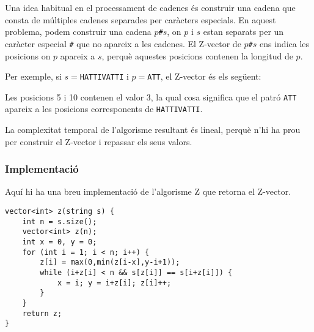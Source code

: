 Una idea habitual en el processament de cadenes és construir una
cadena que consta de múltiples cadenes separades per caràcters
especials. En aquest problema, podem construir una cadena
$p$\texttt{\#}$s$, on $p$ i $s$ estan separats per un caràcter
especial \texttt{\#} que no apareix a les cadenes. El Z-vector de
$p$\texttt{\#}$s$ ens indica les posicions on $p$ apareix a $s$,
perquè aquestes posicions contenen la longitud de $p$.

Per exemple, si $s=$\texttt{HATTIVATTI} i $p=$\texttt{ATT}, el
Z-vector és els següent:


\begin{center}
\end{center}


Les posicions 5 i 10 contenen el valor 3, la qual cosa significa que
el patró \texttt{ATT} apareix a les posicions corresponents de
\texttt{HATTIVATTI}.

La complexitat temporal de l'algorisme resultant és lineal, perquè
n'hi ha prou per construir el Z-vector i repassar els seus valors.

\subsubsection{Implementació}

Aquí hi ha una breu implementació de l'algorisme Z que retorna el Z-vector.


\begin{lstlisting}
vector<int> z(string s) {
    int n = s.size();
    vector<int> z(n);
    int x = 0, y = 0;
    for (int i = 1; i < n; i++) {
        z[i] = max(0,min(z[i-x],y-i+1));
        while (i+z[i] < n && s[z[i]] == s[i+z[i]]) {
            x = i; y = i+z[i]; z[i]++;
        }
    }
    return z;
}
\end{lstlisting}

